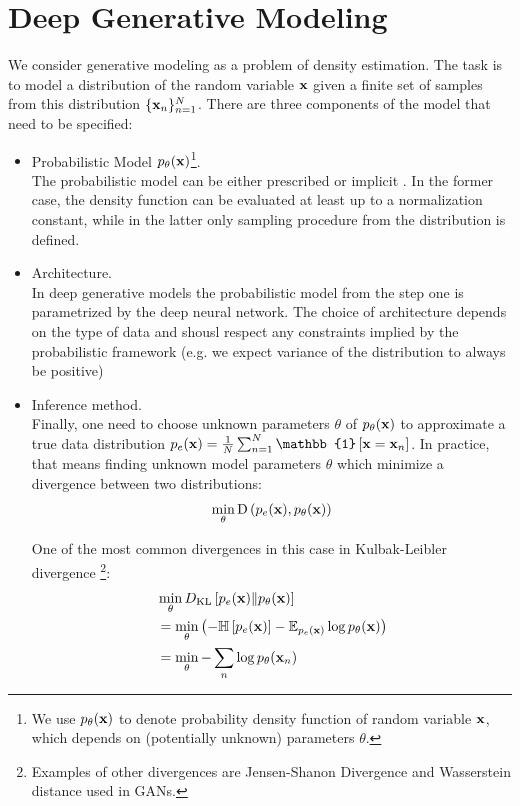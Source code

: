 \section{Deep Generative Modeling}
We consider generative modeling as a problem of density estimation.  The task is to model a distribution of the random variable ${\mathbf{x}}$ given a finite set of samples from this distribution $\{{\mathbf{x}}_n\}_{n=1}^N$. There are three components of the model that need to be specified:
\begin{itemize}
\item Probabilistic Model $p_{\theta}({\mathbf{x}})$\footnote{
	We use $p_{\theta}({\mathbf{x}})$ to denote probability density function of random variable ${\mathbf{x}}$, which depends on (potentially unknown) parameters $\theta$. 
}.\\ 
The probabilistic model can be either prescribed or  implicit \citep{diggle1984monte}. In the former case, the density function can be evaluated at least up to a normalization constant, while in the latter only sampling procedure from the distribution is defined.

\item Architecture.\\
In deep generative models the probabilistic model from the step one is parametrized by the deep neural network. The choice of architecture depends on the type of data and shousl respect any constraints implied by the probabilistic framework (e.g. we expect variance of the distribution to always be positive)

\item Inference method. \\
Finally, one need to choose unknown parameters $\theta$ of $p_{\theta}({\mathbf{x}})$ to approximate a true data distribution $p_e(\rvx)=\frac{1}{N} \sum_{n=1}^N \mathbb{1}\left[\rvx = \rvx_n\right]$. In practice, that means finding unknown model parameters $\theta$ which minimize a divergence between two distributions:
\begin{equation}
\begin{aligned}
\min_{\theta} \text{D}\left(p_{e}({\mathbf{x}}), p_{\theta}({\mathbf{x}})\right) 
\end{aligned}
\end{equation}

One of the most common divergences in this case in Kulbak-Leibler  divergence \footnote{Examples of other divergences are Jensen-Shanon Divergence and Wasserstein distance used in GANs.}:
\begin{equation}
\begin{aligned}
&\min_{\theta} D_{\mathrm{KL}}\left[p_{e}({\mathbf{x}})\|p_{\theta}({\mathbf{x}})\right] \\
& = \min_{\theta}  \left( - \mathbb{H}\left[p_{e}({\mathbf{x}})\right] - \mathbb{E}_{p_{e}({\mathbf{x}})}\log p_{\theta}({\mathbf{x}})\right)\\
& = \min_{\theta}  - \sum_{n}\log p_{\theta}({\mathbf{x}}_n)\\
\end{aligned}
\end{equation}

\end{itemize}


